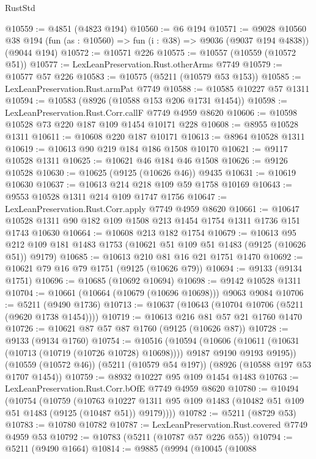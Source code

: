 \begin{lexlean}{RustStd}
\begin{coremodule}
@10559 := @4851 (@4823 @194)
@10560 := @6 @194
@10571 := @9028
    @10560
    @38
    @194
    (fun (as : @10560) => fun (i : @38) => @9036 (@9037 @194 @4838))
    (@9044 @194)
@10572 := @10571 @226
@10575 := @10557 (@10559 (@10572 @51))
@10577 := LexLeanPreservation.Rust.otherArms @7749
@10579 := @10577 @57 @226
@10583 := @10575 (@5211 (@10579 @53 @153))
@10585 := LexLeanPreservation.Rust.armPat @7749
@10588 := @10585 @10227 @57 @1311
@10594 := @10583 (@8926 (@10588 @153 @206 @1731 @1454))
@10598 := LexLeanPreservation.Rust.Corr.callF @7749 @4959 @8620
@10606 := @10598 @10528 @73 @220 @187 @109 @1454 @10171 @228
@10608 := @8955 @10528 @1311
@10611 := @10608 @220 @187 @10171
@10613 := @8964 @10528 @1311
@10619 := @10613 @90 @219 @184 @186 @1508 @10170
@10621 := @9117 @10528 @1311
@10625 := @10621 @46 @184 @46 @1508
@10626 := @9126 @10528
@10630 := @10625 (@9125 (@10626 @46)) @9435
@10631 := @10619 @10630
@10637 := @10613 @214 @218 @109 @59 @1758 @10169
@10643 := @9553 @10528 @1311 @214 @109 @1747 @1756
@10647 := LexLeanPreservation.Rust.Corr.apply @7749 @4959 @8620
@10661 := @10647 @10528 @1311 @90 @182 @109 @1508 @213 @1454 @1754 @1311 @1736 @151 @1743 @10630
@10664 := @10608 @213 @182 @1754
@10679 := @10613
    @95
    @212
    @109
    @181
    @1483
    @1753
    (@10621 @51 @109 @51 @1483 (@9125 (@10626 @51)) @9179)
@10685 := @10613 @210 @81 @16 @21 @1751 @1470
@10692 := @10621 @79 @16 @79 @1751 (@9125 (@10626 @79))
@10694 := @9133 (@9134 @1751)
@10696 := @10685 (@10692 @10694)
@10698 := @9142 @10528 @1311
@10704 := @10661 (@10664 (@10679 (@10696 @10698))) @9063 @9084
@10706 := @5211 (@9490 @1736)
@10713 := @10637 (@10643 (@10704 @10706 (@5211 (@9620 @1738 @1454))))
@10719 := @10613 @216 @81 @57 @21 @1760 @1470
@10726 := @10621 @87 @57 @87 @1760 (@9125 (@10626 @87))
@10728 := @9133 (@9134 @1760)
@10754 := @10516
    (@10594
      (@10606 (@10611 (@10631 (@10713 (@10719 (@10726 @10728) @10698)))) @9187 @9190 @9193 @9195))
    (@10559 (@10572 @46))
    (@5211 (@10579 @54 @197))
    (@8926 (@10588 @197 @53 @1707 @1454))
@10759 := @8932 @10227 @95 @109 @1454 @1483
@10763 := LexLeanPreservation.Rust.Corr.bOfE @7749 @4959 @8620
@10780 := @10494
    (@10754
      (@10759
        (@10763
          @10227
          @1311
          @95
          @109
          @1483
          (@10482 @51 @109 @51 @1483 (@9125 (@10487 @51)) @9179))))
@10782 := @5211 (@8729 @53)
@10783 := @10780 @10782
@10787 := LexLeanPreservation.Rust.covered @7749 @4959 @53
@10792 := @10783 (@5211 (@10787 @57 @226 @55))
@10794 := @5211 (@9490 @1664)
@10814 := @9885
    (@9994
      (@10045
        (@10088

\end{coremodule}
\end{lexlean}
